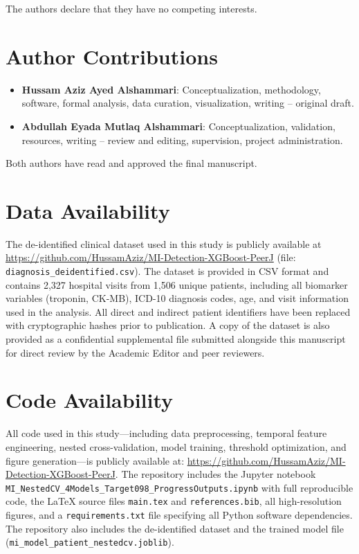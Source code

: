 \documentclass[fleqn,10pt,lineno]{wlpeerj}
\begin{document}
The authors declare that they have no competing interests.

\section*{Author Contributions}

\begin{itemize}[noitemsep]
\item \textbf{Hussam Aziz Ayed Alshammari}: Conceptualization, methodology, software, formal analysis, data curation, visualization, writing -- original draft.
\item \textbf{Abdullah Eyada Mutlaq Alshammari}: Conceptualization, validation, resources, writing -- review and editing, supervision, project administration.
\end{itemize}

Both authors have read and approved the final manuscript.

\section*{Data Availability}

The de-identified clinical dataset used in this study is publicly available at \url{https://github.com/HussamAziz/MI-Detection-XGBoost-PeerJ} (file: \texttt{diagnosis\_deidentified.csv}). The dataset is provided in CSV format and contains 2,327 hospital visits from 1,506 unique patients, including all biomarker variables (troponin, CK-MB), ICD-10 diagnosis codes, age, and visit information used in the analysis. All direct and indirect patient identifiers have been replaced with cryptographic hashes prior to publication. A copy of the dataset is also provided as a confidential supplemental file submitted alongside this manuscript for direct review by the Academic Editor and peer reviewers.

\section*{Code Availability}

All code used in this study---including data preprocessing, temporal feature engineering, nested cross-validation, model training, threshold optimization, and figure generation---is publicly available at: \url{https://github.com/HussamAziz/MI-Detection-XGBoost-PeerJ}. The repository includes the Jupyter notebook \texttt{MI\_NestedCV\_4Models\_Target098\_ProgressOutputs.ipynb} with full reproducible code, the \LaTeX{} source files \texttt{main.tex} and \texttt{references.bib}, all high-resolution figures, and a \texttt{requirements.txt} file specifying all Python software dependencies. The repository also includes the de-identified dataset and the trained model file (\texttt{mi\_model\_patient\_nestedcv.joblib}).


\end{document}
